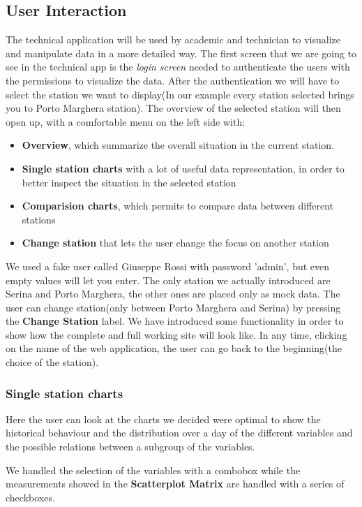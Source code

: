 \documentclass[12pt]{article} %
\begin{document}
\subsection{User Interaction}
The technical application will be used by academic and technician to visualize and manipulate data in a more detailed way. The first screen that we are going to see in the technical app is the \textit{login screen} needed to authenticate the users with the permissions to visualize the data.
After the authentication we will have to select the station we want to display(In our example every station selected brings you to Porto Marghera station).
The overview of the selected station will then open up, with a comfortable menu on the left side with:
\begin{itemize}
	\item \textbf{Overview}, which summarize the overall situation in the current station.
	\item \textbf{Single station charts} with a lot of useful data representation, in order to better inspect the situation in the selected station
	\item \textbf{Comparision charts}, which permits to compare data between different stations
	\item \textbf{Change station} that lets the user change the focus on another station 
\end{itemize}
We used a fake user called Giuseppe Rossi with password 'admin', but even empty values will let you enter.
The only station we actually introduced are Serina and Porto Marghera, the other ones are placed only as mock data.
The user can change station(only between Porto Marghera and Serina) by pressing the \textbf{Change Station} label.
We have introduced some functionality in order to show how the complete and full working site will look like.
In any time, clicking on the name of the web application, the user can go back to the beginning(the choice of the station).

\subsubsection{Single station charts}
Here the user can look at the charts we decided were optimal to show the historical behaviour and the distribution over a day of the different variables and the possible relations between a subgroup of the  variables.

We handled the selection of the variables with a combobox while the measurements showed in the	\textbf{Scatterplot Matrix} are handled with a series of checkboxes.
\end{document}
